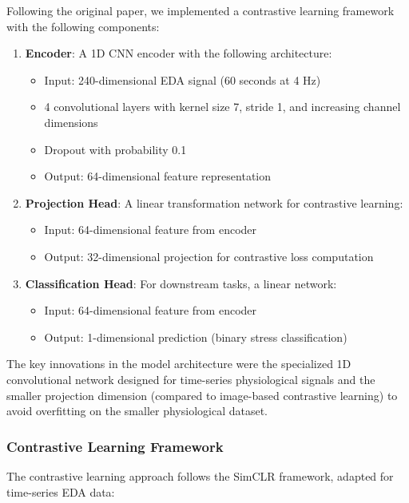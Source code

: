 \documentclass[10pt,letterpaper,twocolumn]{article}
\begin{document}
Following the original paper, we implemented a contrastive learning framework with the following components:

\begin{enumerate}
    \item \textbf{Encoder}: A 1D CNN encoder with the following architecture:
    \begin{itemize}
        \item Input: 240-dimensional EDA signal (60 seconds at 4 Hz)
        \item 4 convolutional layers with kernel size 7, stride 1, and increasing channel dimensions
        \item Dropout with probability 0.1
        \item Output: 64-dimensional feature representation
    \end{itemize}
    
    \item \textbf{Projection Head}: A linear transformation network for contrastive learning:
    \begin{itemize}
        \item Input: 64-dimensional feature from encoder
        \item Output: 32-dimensional projection for contrastive loss computation
    \end{itemize}
    
    \item \textbf{Classification Head}: For downstream tasks, a linear network:
    \begin{itemize}
        \item Input: 64-dimensional feature from encoder
        \item Output: 1-dimensional prediction (binary stress classification)
    \end{itemize}
\end{enumerate}

The key innovations in the model architecture were the specialized 1D convolutional network designed for time-series physiological signals and the smaller projection dimension (compared to image-based contrastive learning) to avoid overfitting on the smaller physiological dataset.

\subsubsection{Contrastive Learning Framework}

The contrastive learning approach follows the SimCLR framework, adapted for time-series EDA data:
\end{document}
